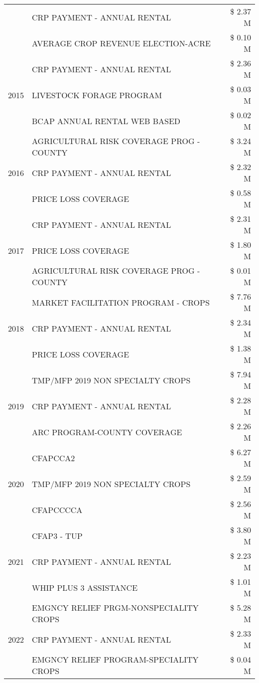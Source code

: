 \begin{tabular}{llr}
 & CRP PAYMENT - ANNUAL RENTAL & \$ 2.37 M \\
 & AVERAGE CROP REVENUE ELECTION-ACRE & \$ 0.10 M \\
\cline{1-3}
\multirow[t]{3}{*}{2015} & CRP PAYMENT - ANNUAL RENTAL & \$ 2.36 M \\
 & LIVESTOCK FORAGE PROGRAM & \$ 0.03 M \\
 & BCAP ANNUAL RENTAL WEB BASED & \$ 0.02 M \\
\cline{1-3}
\multirow[t]{3}{*}{2016} & AGRICULTURAL RISK COVERAGE PROG - COUNTY & \$ 3.24 M \\
 & CRP PAYMENT - ANNUAL RENTAL & \$ 2.32 M \\
 & PRICE LOSS COVERAGE & \$ 0.58 M \\
\cline{1-3}
\multirow[t]{3}{*}{2017} & CRP PAYMENT - ANNUAL RENTAL & \$ 2.31 M \\
 & PRICE LOSS COVERAGE & \$ 1.80 M \\
 & AGRICULTURAL RISK COVERAGE PROG - COUNTY & \$ 0.01 M \\
\cline{1-3}
\multirow[t]{3}{*}{2018} & MARKET FACILITATION PROGRAM - CROPS & \$ 7.76 M \\
 & CRP PAYMENT - ANNUAL RENTAL & \$ 2.34 M \\
 & PRICE LOSS COVERAGE & \$ 1.38 M \\
\cline{1-3}
\multirow[t]{3}{*}{2019} & TMP/MFP 2019 NON SPECIALTY CROPS & \$ 7.94 M \\
 & CRP PAYMENT - ANNUAL RENTAL & \$ 2.28 M \\
 & ARC PROGRAM-COUNTY COVERAGE & \$ 2.26 M \\
\cline{1-3}
\multirow[t]{3}{*}{2020} & CFAPCCA2 & \$ 6.27 M \\
 & TMP/MFP 2019 NON SPECIALTY CROPS & \$ 2.59 M \\
 & CFAPCCCCA & \$ 2.56 M \\
\cline{1-3}
\multirow[t]{3}{*}{2021} & CFAP3 - TUP & \$ 3.80 M \\
 & CRP PAYMENT - ANNUAL RENTAL & \$ 2.23 M \\
 & WHIP PLUS 3 ASSISTANCE & \$ 1.01 M \\
\cline{1-3}
\multirow[t]{3}{*}{2022} & EMGNCY RELIEF PRGM-NONSPECIALITY CROPS & \$ 5.28 M \\
 & CRP PAYMENT - ANNUAL RENTAL & \$ 2.33 M \\
 & EMGNCY RELIEF PROGRAM-SPECIALITY CROPS & \$ 0.04 M \\
\cline{1-3}
\bottomrule
\end{tabular}

